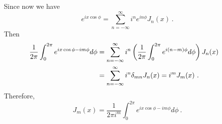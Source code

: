 \documentclass[12pt]{article}
\begin{document}
\newpage
{}
Since now we have
\begin{equation}
    e^{i x \cos \phi} = \sum_{n = -\infty}^\infty  i^n e^{in \phi} J_n(x)~.
\end{equation}
Then
\begin{align}
    \frac{1}{2\pi}\int_0^{2 \pi} e^{ix\cos \phi - im\phi} d\phi &= \sum_{n = -\infty}^\infty i^n \left(\frac{1}{2\pi}\int_{0}^{2\pi} e^{i(n-m)\phi} d\phi\right) J_n(x) \cr
    &= \sum_{n = -\infty}^\infty i^n \delta_{mn} J_n(x) = i^m J_m(x)~.
\end{align}
Therefore,
\begin{equation}
    J_m(x) = \frac{1}{2\pi i^m} \int_0^{2\pi} e^{ix \cos \phi - im \phi} d\phi~.
\end{equation}
\end{document}
